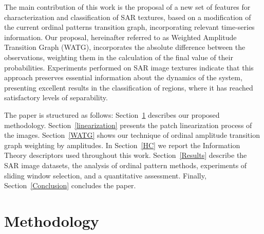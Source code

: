 \documentclass[journal]{IEEEtran}
\begin{document}
The main contribution of this work is the proposal of a new set of features for characterization and classification of SAR textures, based on a modification of the current ordinal patterns transition graph, incorporating relevant time-series information.
Our proposal, hereinafter referred to as Weighted Amplitude Transition Graph (WATG), incorporates the absolute difference between the observations, weighting them in the calculation of the final value of their probabilities.
Experiments performed on SAR image textures indicate that this approach preserves essential information about the dynamics of the system, presenting excellent results in the classification of regions, where it has reached satisfactory levels of separability.


The paper is structured as follows:
Section~\ref{methodology} describes our proposed methodology.
Section~\ref{linearization} presents the patch linearization process of the images.
Section~\ref{WATG} shows our technique of ordinal amplitude transition graph weighting by amplitudes.
In Section~\ref{HC} we report the Information Theory descriptors used throughout this work.
Section~\ref{Results} describe the SAR image datasets, 
the analysis of ordinal pattern methods, 
experiments of sliding window selection, and a
quantitative assessment.
Finally, Section~\ref{Conclusion} concludes the paper.

\section{Methodology}\label{methodology}
\end{document}
